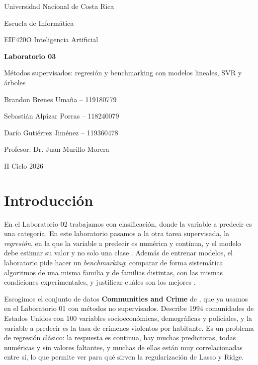 \documentclass[11pt,a4paper]{article}
\let\citepOriginal\citep
\renewcommand*{\citep}[1]{\textbf{\citepOriginal{#1}}}%
\let\citetOriginal\citet
\renewcommand*{\citet}[1]{\textbf{\citetOriginal{#1}}}%
\begin{document}
\begin{titlepage}
\centering
{\large Universidad Nacional de Costa Rica\par}
{\large Escuela de Informática\par}
{\large EIF420O Inteligencia Artificial\par}
\vspace{4cm}
{\LARGE\bfseries Laboratorio 03\par}
\vspace{0.5cm}
{\Large Métodos supervisados: regresión y benchmarking con modelos lineales, SVR y árboles\par}
\vspace{4cm}
{\large Brandon Brenes Umaña -- 119180779\par}
{\large Sebastián Alpízar Porras -- 118240079\par}
{\large Darío Gutiérrez Jiménez -- 119360478\par}
\vspace{2cm}
{\large Profesor: Dr. Juan Murillo-Morera\par}
\vfill
{\large II Ciclo 2026\par}
\end{titlepage}

\tableofcontents
\newpage
\section{Introducción}

En el Laboratorio 02 trabajamos con clasificación, donde la variable a predecir es una categoría. En este laboratorio pasamos a la otra tarea supervisada, la \textit{regresión}, en la que la variable a predecir es numérica y continua, y el modelo debe estimar su valor y no solo una clase \citep{james2013,hastie2009}. Además de entrenar modelos, el laboratorio pide hacer un \textit{benchmarking}: comparar de forma sistemática algoritmos de una misma familia y de familias distintas, con las mismas condiciones experimentales, y justificar cuáles son los mejores \citep{hothorn2005}.

Escogimos el conjunto de datos \textbf{Communities and Crime} de \citet{redmond2002}, que ya usamos en el Laboratorio 01 con métodos no supervisados. Describe 1994 comunidades de Estados Unidos con 100 variables socioeconómicas, demográficas y policiales, y la variable a predecir es la tasa de crímenes violentos por habitante. Es un problema de regresión clásico: la respuesta es continua, hay muchas predictoras, todas numéricas y sin valores faltantes, y muchas de ellas están muy correlacionadas entre sí, lo que permite ver para qué sirven la regularización de Lasso y Ridge.
\end{document}
